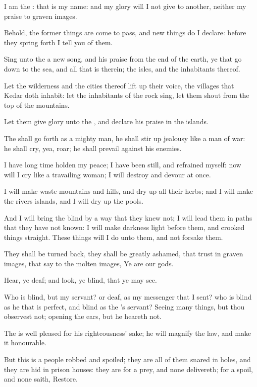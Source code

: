\verse I am the \LORD: that is my name: and my glory will I not give to another, neither my praise to graven images.

\verse Behold, the former things are come to pass, and new things do I declare: before they spring forth I tell you of them.

\verse Sing unto the \LORD a new song, and his praise from the end of the earth, ye that go down to the sea, and all that is therein; the isles, and the inhabitants thereof.

\verse Let the wilderness and the cities thereof lift up their voice, the villages that Kedar doth inhabit: let the inhabitants of the rock sing, let them shout from the top of the mountains.

\verse Let them give glory unto the \LORD, and declare his praise in the islands.

\verse The \LORD shall go forth as a mighty man, he shall stir up jealousy like a man of war: he shall cry, yea, roar; he shall prevail against his enemies.

\verse I have long time holden my peace; I have been still, and refrained myself: now will I cry like a travailing woman; I will destroy and devour at once.

\verse I will make waste mountains and hills, and dry up all their herbs; and I will make the rivers islands, and I will dry up the pools.

\verse And I will bring the blind by a way that they knew not; I will lead them in paths that they have not known: I will make darkness light before them, and crooked things straight. These things will I do unto them, and not forsake them.

\verse They shall be turned back, they shall be greatly ashamed, that trust in graven images, that say to the molten images, Ye are our gods.

\verse Hear, ye deaf; and look, ye blind, that ye may see.

\verse Who is blind, but my servant? or deaf, as my messenger that I sent?  who is blind as he that is perfect, and blind as the \LORD's servant?  \verse Seeing many things, but thou observest not; opening the ears, but he heareth not.

\verse The \LORD is well pleased for his righteousness' sake; he will magnify the law, and make it honourable.

\verse But this is a people robbed and spoiled; they are all of them snared in holes, and they are hid in prison houses: they are for a prey, and none delivereth; for a spoil, and none saith, Restore.

